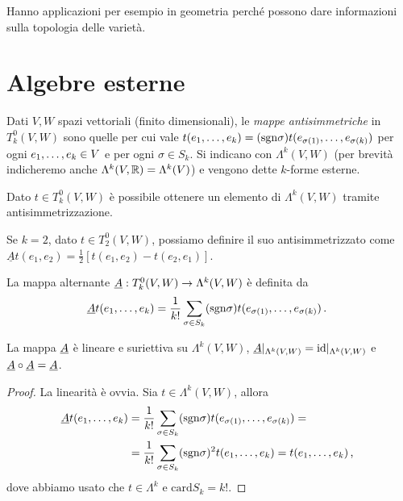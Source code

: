 Hanno applicazioni per esempio in geometria perché possono dare informazioni sulla topologia delle varietà.

\section{Algebre esterne}

Dati $V,W$ spazi vettoriali (finito dimensionali), le \emph{mappe antisimmetriche} in $T^0_k(V,W)$ sono quelle per cui vale $t(\seqb{e}{k}{,}) = (\sgn \sigma) t(e_{\sigma(1)},\ldots, e_{\sigma(k)})$ per ogni $\seqb{e}{k}{,} \in V$ e per ogni $\sigma\in S_k$.
Si indicano con $\Lambda^k(V,W)$ (per brevità indicheremo anche $\Lambda^k(V,\R) = \Lambda^k(V)$) e vengono dette $k$-forme esterne.

Dato $t\in T^0_k(V,W)$ è possibile ottenere un elemento di $\Lambda^k(V,W)$ tramite antisimmetrizzazione. 
\begin{example}
	Se $k=2$, dato $t\in T^0_2(V,W)$, possiamo definire il suo antisimmetrizzato come $\underline{A}t(e_1,e_2) = \frac 12 [t(e_1,e_2) - t(e_2,e_1)]$.
\end{example}

\begin{definition}
	La mappa alternante $\antisimm:T^0_k(V,W) \to \Lambda^k(V,W)$ è definita da
	\begin{equation*}
		\antisimm t(\seqb{e}{k}{,}) = \frac 1 {k!} \sum_{\sigma \in S_k} (\sgn \sigma) t(e_{\sigma(1)},\ldots, e_{\sigma(k)}) \punto
	\end{equation*}
\end{definition}

\begin{proposition}
	La mappa $\antisimm$ è lineare e suriettiva su $\Lambda^k(V,W)$, $\antisimm\restrict{\Lambda^k(V,W)} = \id\restrict{\Lambda^k(V,W)}$ e $\antisimm \circ \antisimm = \antisimm$.
\end{proposition}
\begin{proof}
	La linearità è ovvia. Sia $t\in\Lambda^k(V,W)$, allora
	\begin{align*}
		\antisimm t(\seqb{e}{k}{,}) &= \frac 1 {k!} \sum_{\sigma \in S_k} (\sgn \sigma) t(e_{\sigma(1)},\ldots, e_{\sigma(k)}) =\\
		& = \frac 1 {k!} \sum_{\sigma \in S_k} (\sgn \sigma)^2 t(\seqb{e}{k}{,}) = t (\seqb{e}{k}{,}) \virgola
	\end{align*}
	dove abbiamo usato che $t\in\Lambda^k$ e $\mathrm{card} S_k = k!$.
\end{proof}

